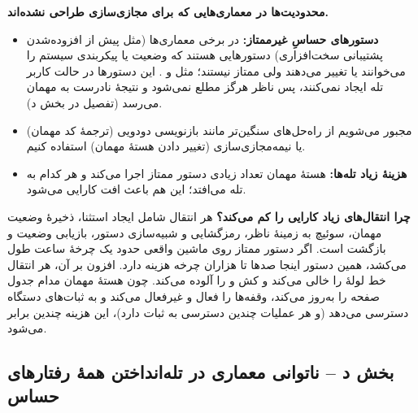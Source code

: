 \textbf{محدودیت‌ها در معماری‌هایی که برای مجازی‌سازی طراحی نشده‌اند.}
\begin{itemize}
  \item \textbf{دستورهای حساسِ غیرممتاز:} در برخی معماری‌ها (مثل  پیش از افزوده‌شدن پشتیبانی سخت‌افزاری) دستورهایی هستند که وضعیت یا پیکربندی سیستم را می‌خوانند یا تغییر می‌دهند ولی ممتاز نیستند؛ مثل  و . این دستورها در حالت کاربر تله ایجاد نمی‌کنند، پس ناظر هرگز مطلع نمی‌شود و نتیجهٔ نادرست به مهمان می‌رسد (تفصیل در بخش د).
  \item مجبور می‌شویم از راه‌حل‌های سنگین‌تر مانند بازنویسی دودویی (ترجمهٔ کد مهمان) یا نیمه‌مجازی‌سازی (تغییر دادن هستهٔ مهمان) استفاده کنیم.
  \item \textbf{هزینهٔ زیاد تله‌ها:} هستهٔ مهمان تعداد زیادی دستور ممتاز اجرا می‌کند و هر کدام به تله می‌افتد؛ این هم باعث افت کارایی می‌شود.
\end{itemize}

\textbf{چرا انتقال‌های زیاد کارایی را کم می‌کند؟} هر انتقال شامل ایجاد استثنا، ذخیرهٔ وضعیت مهمان، سوئیچ به زمینهٔ ناظر، رمزگشایی و شبیه‌سازی دستور، بازیابی وضعیت و بازگشت است. اگر دستور ممتاز روی ماشین واقعی حدود یک چرخهٔ ساعت طول می‌کشد، همین دستور اینجا صدها تا هزاران چرخه هزینه دارد. افزون بر آن، هر انتقال خط لولهٔ  را خالی می‌کند و کش و  را آلوده می‌کند. چون هستهٔ مهمان مدام جدول صفحه را به‌روز می‌کند، وقفه‌ها را فعال و غیرفعال می‌کند و به ثبات‌های دستگاه دسترسی می‌دهد (و هر عملیات  چندین دسترسی به ثبات دارد)، این هزینه چندین برابر می‌شود.

\subsection*{بخش د – ناتوانی معماری در تله‌انداختن همهٔ رفتارهای حساس}

